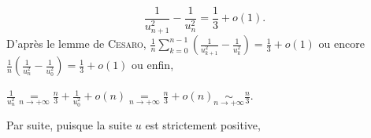 {\begin{enumerate}
{$$\frac{1}{u_{n+1}^2}-\frac{1}{u_n^2}=\frac{1}{3}+o(1).$$
D'après le lemme de \textsc{Cesaro}, $\frac{1}{n}\sum_{k=0}^{n-1}\left(\frac{1}{u_{k+1}^2}-\frac{1}{u_k^2}\right)=\frac{1}{3}+o(1)$ ou encore $\frac{1}{n}\left(\frac{1}{u_n^2}-\frac{1}{u_0^2}\right)=\frac{1}{3}+o(1)$ ou enfin, 

\begin{center}
$\frac{1}{u_n^2}\underset{n\rightarrow+\infty}{=}\frac{n}{3}+\frac{1}{u_0^2}+o(n)\underset{n\rightarrow+\infty}{=}\frac{n}{3}+o(n)\underset{n\rightarrow+\infty}{\sim}\frac{n}{3}$.
\end{center}
Par suite, puisque la suite $u$ est strictement positive, 

\begin{center}
\end{center}
}
\end{enumerate}
}
